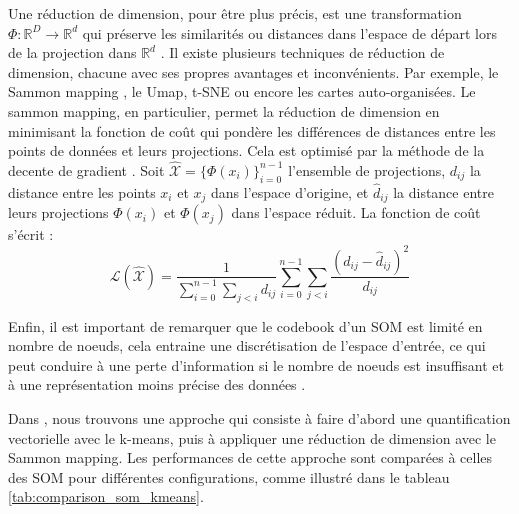 \documentclass[12pt,a4paper]{report}
\begin{document}
Une réduction de dimension, pour être plus précis, est une transformation $\Phi: \mathbb{R}^D \rightarrow \mathbb{R}^d$ qui préserve les similarités ou distances dans l'espace de départ 
lors de la projection dans $\mathbb{R}^d$ \cite{BorgGroenen2005}. Il existe plusieurs techniques de réduction de dimension, chacune avec ses propres avantages et inconvénients. 
Par exemple, le Sammon mapping \cite{Sammon1969}, le Umap\cite{UMAP2018}, t-SNE\cite{TSNE2008} ou encore les cartes auto-organisées. Le sammon mapping, en particulier, permet la réduction de dimension en minimisant la fonction de coût 
qui pondère les différences de distances entre les points de données et leurs projections. Cela est optimisé par la méthode de la decente de gradient \cite{Limitations_SOM}.
Soit $\hat{\mathcal{X}} = \{\Phi(x_i)\}_{i=0}^{n-1}$ l'ensemble de projections, $d_{ij}$ la distance entre les points $x_i$ et $x_j$ dans l'espace d'origine, et $\hat{d}_{ij}$ la distance entre leurs projections $\Phi(x_i)$ et $\Phi(x_j)$ dans l'espace réduit. 
La fonction de coût s'écrit :
$$\mathcal{L}(\hat{\mathcal{X}}) = \frac{1}{\sum_{i=0}^{n-1} \sum_{j < i} d_{ij}} \sum_{i=0}^{n-1} \sum_{j < i}  \frac{(d_{ij} - \hat{d}_{ij})^2}{d_{ij}}$$

Enfin, il est important de remarquer que le codebook d'un SOM est limité en nombre de noeuds, cela entraine une discrétisation de l'espace d'entrée, 
ce qui peut conduire à une perte d'information si le nombre de noeuds est insuffisant et à une représentation moins précise des données \cite{Limitations_SOM}.

Dans \cite{Limitations_SOM}, nous trouvons une approche qui consiste à faire d'abord une quantification vectorielle avec le k-means, puis à appliquer une réduction de dimension avec le Sammon mapping.
Les performances de cette approche sont comparées à celles des SOM pour différentes configurations, comme illustré dans le tableau \ref{tab:comparison_som_kmeans}.
\end{document}

